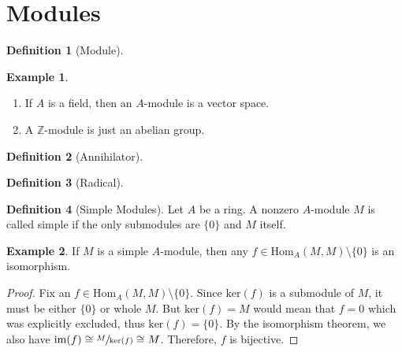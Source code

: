 \documentclass[a4paper]{book}
\theoremstyle{definition}
\newtheorem{definition}{Definition}[]
\newtheorem{example}{Example}[definition]
\begin{document}
\part{Modules}

\begin{defbox}
    \begin{definition}[Module]
    \end{definition}
\end{defbox}

\begin{exmbox}
    \begin{example}
        \begin{enumerate}
            \item If \(A\) is a field, then an \(A\)-module is a vector space.
            \item A \(\mathbb{Z}\)-module is just an abelian group.
        \end{enumerate}
    \end{example}
\end{exmbox}

\begin{defbox}
    \begin{definition}[Annihilator]
        
    \end{definition}
\end{defbox}

\begin{defbox}
    \begin{definition}[Radical]
        
    \end{definition}
\end{defbox}

\begin{defbox}
    \begin{definition}[Simple Modules]
        Let \(A\) be a ring. A nonzero \(A\)-module \(M\) is called simple if the only submodules are \(\{0\}\) and \(M\) itself.
    \end{definition}
\end{defbox}

\begin{example}
    If \(M\) is a simple \(A\)-module, then any \(f \in \mathrm{Hom}_A (M, M) \setminus \{0\}\) is an isomorphism.
\end{example}

\begin{proof}
    Fix an \(f \in \mathrm{Hom}_A (M, M) \setminus \{0\}\). Since \(\mathrm{ker}(f)\) is a submodule of \(M\), it must be either \(\{0\}\) or whole \(M\). But \(\mathrm{ker}(f) = M\) would mean that \(f = 0\) which was explicitly excluded, thus \(\mathrm{ker}(f) = \{0\}\). By the isomorphism theorem, we also have \(\mathrm{im}(f) \cong \sfrac{M}{\mathrm{ker}(f)} \cong M\). Therefore, \(f\) is bijective.
\end{proof}
\end{document}
